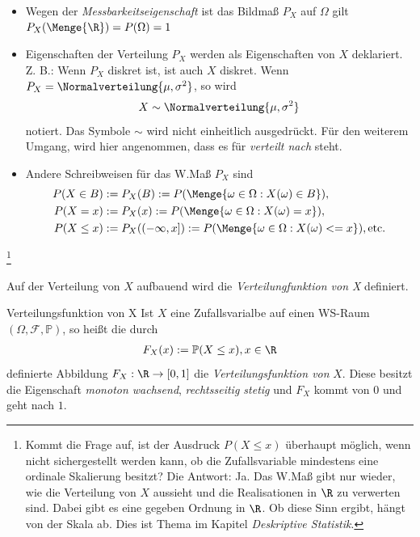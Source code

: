 \begin{itemize}
	\item Wegen der \textit{Messbarkeitseigenschaft} ist das Bildmaß $P_X$ auf $\Omega$ gilt $P_X(\Menge{\R}) = P(\Omega) = 1$
	\item Eigenschaften der Verteilung $P_X$ werden als Eigenschaften von $X$ deklariert. Z. B.: Wenn $P_X$ diskret ist, ist auch $X$ diskret. Wenn $P_X = \Normalverteilung{\mu, \sigma^2}$, so wird 
	\begin{align*}
		X \sim \Normalverteilung{\mu, \sigma^2}
	\end{align*}
	notiert.  Das Symbole $\sim$ wird nicht einheitlich ausgedrückt. Für den weiterem Umgang, wird hier angenommen, dass es für \textit{verteilt nach} steht.
	\item Andere Schreibweisen für das \gls{W.}Maß $P_X$ sind
	\begin{align*}
		P(X\in B) &:= P_X(B) := P(\Menge{\omega \in \Omega: X(\omega)\in B}),\\
		P(X = x) &:= P_X({x}) := P(\Menge{\omega \in \Omega: X(\omega) = x}),\\
		P(X \leq x) & := P_X((-\infty, x]) := P(\Menge{\omega \in \Omega: X(\omega) <= x}),
		\text{etc.}
	\end{align*}
\end{itemize}
\footnote{Kommt die Frage auf, ist der Ausdruck $P(X\leq x)$ überhaupt möglich, wenn nicht sichergestellt werden kann, ob die Zufallsvariable mindestens eine ordinale Skalierung besitzt? Die Antwort: Ja. Das \gls{W.}Maß gibt nur wieder, wie die Verteilung von $X$ aussieht und die Realisationen in $\R$ zu verwerten sind. Dabei gibt es eine gegeben Ordnung in $\R$. Ob diese Sinn ergibt, hängt von der Skala ab. Dies ist Thema im Kapitel \textit{Deskriptive Statistik}.}

Auf der Verteilung von $X$ aufbauend wird die \textit{Verteilungfunktion von X} definiert.
\begin{Definition}{Verteilungsfunktion von X}
	Ist $X$ eine Zufallsvarialbe auf einen WS-Raum $(\Omega, \mathcal{F}, \mathbb{P})$, so heißt die durch 
	\begin{align*}
		F_X(x):= 	\mathbb{P}(X\leq x), x\in \R
	\end{align*}
	definierte Abbildung $F_X: \R \rightarrow [0,1]$ die \textit{Verteilungsfunktion von} $X$. Diese besitzt die Eigenschaft \textit{monoton wachsend}, \textit{rechtsseitig stetig} und $F_X$ kommt von 0 und geht nach $1$.
\end{Definition}

